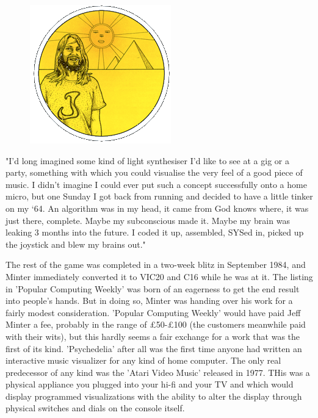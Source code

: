 \begin{definition}
\setlength{\intextsep}{0pt}%
\setlength{\columnsep}{3pt}%
\begin{figure}
\includegraphics[width=\linewidth]{src/callout/psych.png} 
\end{figure}
\small
"I'd long
imagined some kind of light synthesiser I'd like to see at a gig or a party,
something with which you could visualise the very feel of a good piece of
music. I didn't imagine I could ever put such a concept successfully onto a
home micro, but one Sunday I got back from running and decided to have a
little tinker on my ‘64. An algorithm was in my head, it came from God
knows where, it was just there, complete. Maybe my subconscious made it.
Maybe my brain was leaking 3 months into the future. I coded it up,
assembled, SYSed in, picked up the joystick and blew my brains out."
\end{definition}

The rest of the game was completed in a two-week blitz in September 1984, and Minter immediately converted it to VIC20 and C16 while he was at it.
The listing in 'Popular Computing Weekly' was born of an eagerness to get the end result into people's hands. But in doing so, Minter
was handing over his work for a fairly modest consideration. 'Popular Computing Weekly' would have paid Jeff Minter a fee, probably in the range of £50-£100 (the customers meanwhile paid with their wits), but this hardly seems a fair exchange for a work that was the first of its kind.
'Psychedelia' after all was the first time anyone had written an interactive music visualizer for any kind of home computer. The only 
real predecessor of any kind was the 'Atari Video Music' released in 1977. THis was a physical appliance you plugged into your hi-fi and
your TV and which would display programmed visualizations with the ability to alter the display through physical switches and dials on the 
console itself.

